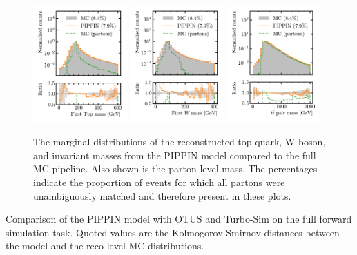 \begin{figure}[htb]
    \centering
    \includegraphics[width=0.32\textwidth]{Figures/jet_generation/pippin/masses/mass_top1.pdf}
    \includegraphics[width=0.32\textwidth]{Figures/jet_generation/pippin/masses/mass_w1.pdf}
    \includegraphics[width=0.32\textwidth]{Figures/jet_generation/pippin/masses/mass_ttbar.pdf}
    \caption{
        The marginal distributions of the reconstructed top quark, W boson, and \ttbar invariant masses from the PIPPIN model compared to the full MC pipeline.
        Also shown is the parton level mass.
        The percentages indicate the proportion of events for which all partons were unambiguously matched and therefore present in these plots.
    }
    \label{fig:pippin_mass}
\end{figure}

\begin{table}[htb]
    \centering
    \renewcommand{\arraystretch}{1.5}
    \caption{Comparison of the PIPPIN model with OTUS and Turbo-Sim on the full forward simulation task. Quoted values are the Kolmogorov-Smirnov distances between the model and the reco-level MC distributions.}
    \label{tab:pippin}
    
\end{table}

